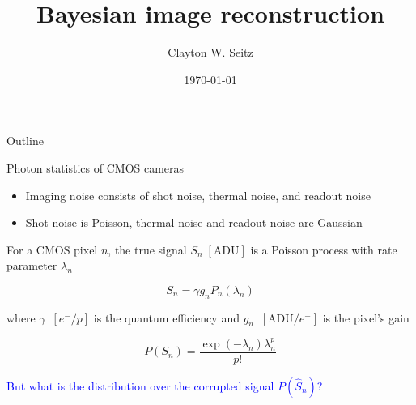 \documentclass[aspectratio=1610]{beamer}					%
\title{Bayesian image reconstruction}	%
\author{Clayton W. Seitz}								%
\date{\today}									%
\begin{document}
\begin{frame}
  \titlepage
\end{frame}

\begin{frame}{Outline}
  \tableofcontents
\end{frame}

%


\begin{frame}{Photon statistics of CMOS cameras}
\begin{itemize}
\item Imaging noise consists of shot noise, thermal noise, and readout noise
\vspace{0.1in}
\item Shot noise is Poisson, thermal noise and readout noise are Gaussian
\end{itemize}
\vspace{0.2in}
For a CMOS pixel $n$, the true signal $S_{n}\; [\mathrm{ADU}]$ is a Poisson process with rate parameter $\lambda_{n}$

\begin{equation*}
S_{n} = \gamma g_{n}P_{n}(\lambda_{n})
\end{equation*}

where $\gamma\;\;[e^{-}/p]$ is the quantum efficiency and $g_{n}\;\; [\mathrm{ADU}/e^{-}]$ is the pixel's gain
\vspace{0.1in}

\begin{equation*}
P(S_{n}) = \frac{\exp\left({-\lambda_{n}}\right)\lambda_{n}^{p}}{p!}
\end{equation*}

\textcolor{blue}{But what is the distribution over the corrupted signal $P(\hat{S}_{n})$?}


\end{frame}
\end{document}
